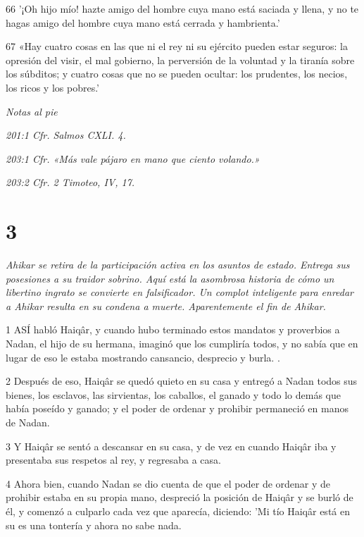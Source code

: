 \par 66 '¡Oh hijo mío! hazte amigo del hombre cuya mano está saciada y llena, y no te hagas amigo del hombre cuya mano está cerrada y hambrienta.'

\par 67 «Hay cuatro cosas en las que ni el rey ni su ejército pueden estar seguros: la opresión del visir, el mal gobierno, la perversión de la voluntad y la tiranía sobre los súbditos; y cuatro cosas que no se pueden ocultar: los prudentes, los necios, los ricos y los pobres.'

\par \textit{Notas al pie}

\par \textit{201:1 Cfr. Salmos CXLI. 4.}

\par \textit{203:1 Cfr. «Más vale pájaro en mano que ciento volando.»}

\par \textit{203:2 Cfr. 2 Timoteo, IV, 17.}

\chapter{3}

\par \textit{Ahikar se retira de la participación activa en los asuntos de estado. Entrega sus posesiones a su traidor sobrino. Aquí está la asombrosa historia de cómo un libertino ingrato se convierte en falsificador. Un complot inteligente para enredar a Ahikar resulta en su condena a muerte. Aparentemente el fin de Ahikar.}

\par 1 ASÍ habló Haiqâr, y cuando hubo terminado estos mandatos y proverbios a Nadan, el hijo de su hermana, imaginó que los cumpliría todos, y no sabía que en lugar de eso le estaba mostrando cansancio, desprecio y burla. .

\par 2 Después de eso, Haiqâr se quedó quieto en su casa y entregó a Nadan todos sus bienes, los esclavos, las sirvientas, los caballos, el ganado y todo lo demás que había poseído y ganado; y el poder de ordenar y prohibir permaneció en manos de Nadan.

\par 3 Y Haiqâr se sentó a descansar en su casa, y de vez en cuando Haiqâr iba y presentaba sus respetos al rey, y regresaba a casa.

\par 4 Ahora bien, cuando Nadan se dio cuenta de que el poder de ordenar y de prohibir estaba en su propia mano, despreció la posición de Haiqâr y se burló de él, y comenzó a culparlo cada vez que aparecía, diciendo: 'Mi tío Haiqâr está en su es una tontería y ahora no sabe nada.

